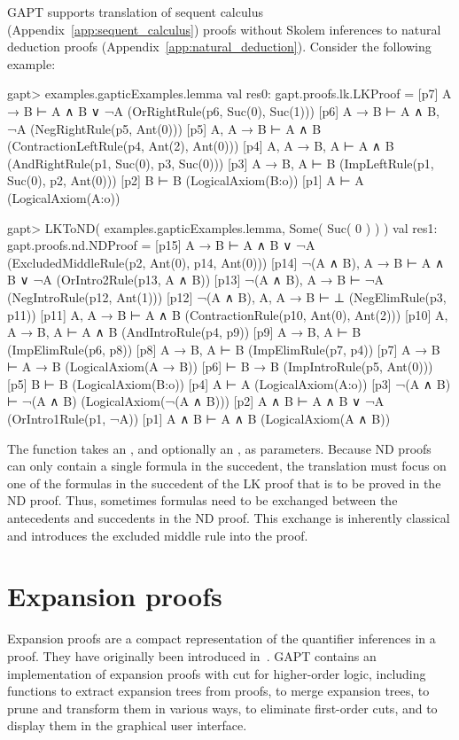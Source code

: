 \documentclass[a4paper,11pt]{book}
\newcommand{\cli}[1]{{\ttfamily {#1}}}
\begin{document}
GAPT supports translation of sequent calculus
(Appendix~\ref{app:sequent_calculus}) proofs without Skolem inferences
to natural deduction proofs (Appendix~\ref{app:natural_deduction}).
Consider the following example:
\begin{clilisting}
gapt> examples.gapticExamples.lemma
val res0: gapt.proofs.lk.LKProof = [p7] A → B ⊢ A ∧ B ∨ ¬A    (OrRightRule(p6, Suc(0), Suc(1)))
[p6] A → B ⊢ A ∧ B, ¬A    (NegRightRule(p5, Ant(0)))
[p5] A, A → B ⊢ A ∧ B    (ContractionLeftRule(p4, Ant(2), Ant(0)))
[p4] A, A → B, A ⊢ A ∧ B    (AndRightRule(p1, Suc(0), p3, Suc(0)))
[p3] A → B, A ⊢ B    (ImpLeftRule(p1, Suc(0), p2, Ant(0)))
[p2] B ⊢ B    (LogicalAxiom(B:o))
[p1] A ⊢ A    (LogicalAxiom(A:o))

gapt> LKToND( examples.gapticExamples.lemma, Some( Suc( 0 ) ) )
val res1: gapt.proofs.nd.NDProof = [p15] A → B ⊢ A ∧ B ∨ ¬A    (ExcludedMiddleRule(p2, Ant(0), p14, Ant(0)))
[p14] ¬(A ∧ B), A → B ⊢ A ∧ B ∨ ¬A    (OrIntro2Rule(p13, A ∧ B))
[p13] ¬(A ∧ B), A → B ⊢ ¬A    (NegIntroRule(p12, Ant(1)))
[p12] ¬(A ∧ B), A, A → B ⊢ ⊥    (NegElimRule(p3, p11))
[p11] A, A → B ⊢ A ∧ B    (ContractionRule(p10, Ant(0), Ant(2)))
[p10] A, A → B, A ⊢ A ∧ B    (AndIntroRule(p4, p9))
[p9] A → B, A ⊢ B    (ImpElimRule(p6, p8))
[p8] A → B, A ⊢ B    (ImpElimRule(p7, p4))
[p7] A → B ⊢ A → B    (LogicalAxiom(A → B))
[p6]  ⊢ B → B    (ImpIntroRule(p5, Ant(0)))
[p5] B ⊢ B    (LogicalAxiom(B:o))
[p4] A ⊢ A    (LogicalAxiom(A:o))
[p3] ¬(A ∧ B) ⊢ ¬(A ∧ B)    (LogicalAxiom(¬(A ∧ B)))
[p2] A ∧ B ⊢ A ∧ B ∨ ¬A    (OrIntro1Rule(p1, ¬A))
[p1] A ∧ B ⊢ A ∧ B    (LogicalAxiom(A ∧ B))

\end{clilisting}
The \cli{LKToND} function takes an \cli{LKProof}, and optionally an
\cli{Option[SequentIndex]}, as parameters.  Because ND proofs can only
contain a single formula in the succedent, the translation must focus on one
of the formulas in the succedent of the LK proof that is to be proved in the ND
proof.
Thus, sometimes formulas need to be exchanged between the antecedents and
succedents in the ND proof. This exchange is inherently classical and introduces
the excluded middle rule into the proof.

\section{Expansion proofs}

Expansion proofs are a compact representation of the quantifier inferences in a
proof.  They have originally been introduced in~\cite{Miller87Compact}.  GAPT
contains an implementation of expansion proofs with cut for higher-order logic,
including functions to extract expansion trees from proofs, to merge expansion
trees, to prune and transform them in various ways, to eliminate first-order
cuts, and to display them in the graphical user interface.
\end{document}
